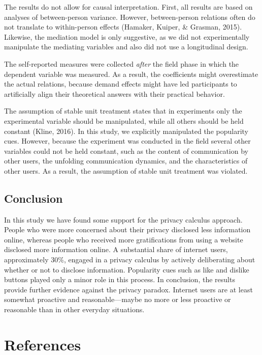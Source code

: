 \documentclass[
  english,
  man,floatsintext]{apa6}
\begin{document}
The results do not allow for causal interpretation.
First, all results are based on analyses of between-person variance.
However, between-person relations often do not translate to within-person effects (Hamaker, Kuiper, \& Grasman, 2015).
Likewise, the mediation model is only suggestive, as we did not experimentally manipulate the mediating variables and also did not use a longitudinal design.

The self-reported measures were collected \emph{after} the field phase in which the dependent variable was measured.
As a result, the coefficients might overestimate the actual relations, because demand effects might have led participants to artificially align their theoretical answers with their practical behavior.

The assumption of stable unit treatment states that in experiments only the experimental variable should be manipulated, while all others should be held constant (Kline, 2016).
In this study, we explicitly manipulated the popularity cues.
However, because the experiment was conducted in the field several other variables could not be held constant, such as the content of communication by other users, the unfolding communication dynamics, and the characteristics of other users.
As a result, the assumption of stable unit treatment was violated.

\hypertarget{conclusion}{%
\subsection{Conclusion}\label{conclusion}}

In this study we have found some support for the privacy calculus approach.
People who were more concerned about their privacy disclosed less information online, whereas people who received more gratifications from using a website disclosed more information online.
A substantial share of internet users, approximately 30\%, engaged in a privacy calculus by actively deliberating about whether or not to disclose information.
Popularity cues such as like and dislike buttons played only a minor role in this process.
In conclusion, the results provide further evidence against the privacy paradox.
Internet users are at least somewhat proactive and reasonable---maybe no more or less proactive or reasonable than in other everyday situations.

\newpage

\hypertarget{references}{%
\section{References}\label{references}}
\end{document}
